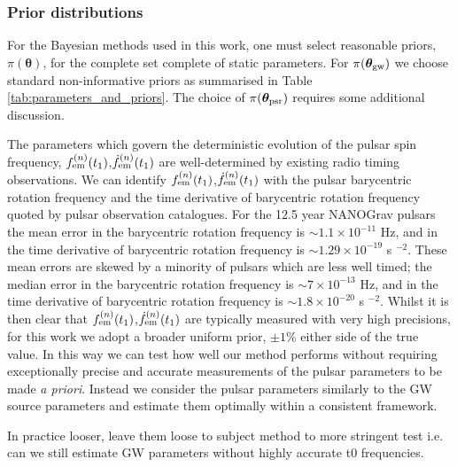 \documentclass[fleqn,usenatbib,useAMS]{mnras}
\begin{document}
\subsubsection{Prior distributions}\label{sec:priors}

For the Bayesian methods used in this work, one must select reasonable priors, $\pi(\boldsymbol{\theta})$, for the complete set complete of static parameters. For $\pi(\boldsymbol{\theta}_{\rm gw})$ we choose standard non-informative priors \citep[e.g.][]{Bhagwat2021} as summarised in Table \ref{tab:parameters_and_priors}. The choice of $\pi(\boldsymbol{\theta}_{\rm psr})$ requires some additional discussion. \newline 


The parameters which govern the deterministic evolution of the pulsar spin frequency, $f_{\rm em}^{(n)} (t_1)$,$\dot{f}_{\rm em}^{(n)} (t_1)$ are well-determined by existing radio timing observations. We can identify $f_{\rm em}^{(n)} (t_1)$,$\dot{f}_{\rm em}^{(n)} (t_1)$ with the pulsar  barycentric rotation frequency and the time derivative of barycentric rotation frequency quoted by pulsar observation catalogues. For the 12.5 year NANOGrav pulsars the mean error in the barycentric rotation frequency is $\sim 1.1 \times 10^{-11}$ Hz, and in the time derivative of barycentric rotation frequency is $\sim 1.29 \times 10^{-19}$ s $^{-2}$. These mean errors are skewed by a minority of pulsars which are less well timed; the median error in  the barycentric rotation frequency is $\sim 7 \times 10^{-13}$ Hz, and in the time derivative of barycentric rotation frequency is $\sim 1.8 \times 10^{-20}$ s $^{-2}$. Whilst it is then clear that $f_{\rm em}^{(n)} (t_1)$,$\dot{f}_{\rm em}^{(n)} (t_1)$ are typically measured with very high precisions, for this work we adopt a broader uniform prior, $\pm 1 \%$ either side of the true value. In this way we can test how well our method performs without requiring exceptionally precise and accurate measurements of the pulsar parameters to be made \textit{a priori}. Instead we consider the pulsar parameters similarly to the GW source parameters and estimate them optimally within a consistent framework. \newline 


In practice looser, leave them loose to subject method to more stringent test i.e. can we still estimate GW parameters without highly accurate t0 frequencies.
\end{document}
